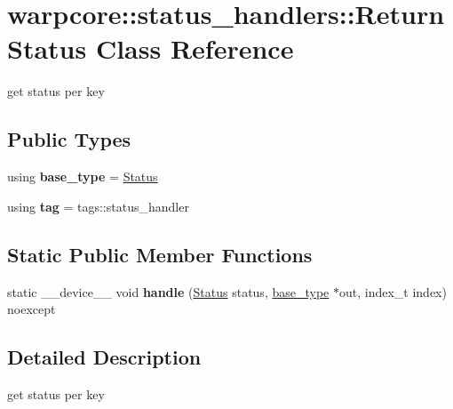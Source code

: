 \hypertarget{classwarpcore_1_1status__handlers_1_1ReturnStatus}{}\section{warpcore\+:\+:status\+\_\+handlers\+:\+:Return\+Status Class Reference}
\label{classwarpcore_1_1status__handlers_1_1ReturnStatus}


get status per key  


\subsection*{Public Types}
\begin{DoxyCompactItemize}
\item 
\mbox{\label{classwarpcore_1_1status__handlers_1_1ReturnStatus_a3e16c8e7a75e808d451ac77b724ad8b0}} 
using {\bfseries base\+\_\+type} = \hyperlink{classwarpcore_1_1Status}{Status}
\item 
\mbox{\label{classwarpcore_1_1status__handlers_1_1ReturnStatus_a7bccfa528d7a667ccbace24cf0a49118}} 
using {\bfseries tag} = tags\+::status\+\_\+handler
\end{DoxyCompactItemize}
\subsection*{Static Public Member Functions}
\begin{DoxyCompactItemize}
\item 
\mbox{\label{classwarpcore_1_1status__handlers_1_1ReturnStatus_ab8f496367e830907433b9f5965477f6f}} 
static \+\_\+\+\_\+device\+\_\+\+\_\+ void {\bfseries handle} (\hyperlink{classwarpcore_1_1Status}{Status} status, \hyperlink{classwarpcore_1_1Status}{base\+\_\+type} $\ast$out, index\+\_\+t index) noexcept
\end{DoxyCompactItemize}


\subsection{Detailed Description}
get status per key 